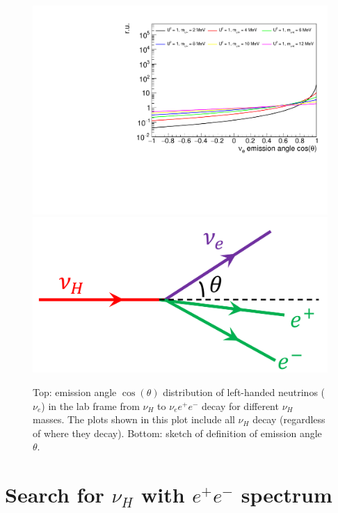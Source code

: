 \documentclass[%
 reprint,
 amsmath,amssymb,
 aps,
 prd,
floatfix,
twocolumn,
]{revtex4-1}
\begin{document}
\begin{figure}[!htbp]
\includegraphics[width=0.99\columnwidth]{../plots/nuLEmissionAngle_U1.0_AllMass_linXlogY.pdf}\\
\includegraphics[width=0.7\columnwidth]{figs/emission_angle_sketch.png}
\caption{Top: emission angle $\cos(\theta)$ distribution of left-handed neutrinos ($\nu_e$) in the lab frame from $\nu_H$ to $\nu_e e^+ e^-$ decay for different $\nu_H$ masses. The plots shown in this plot include all $\nu_H$ decay (regardless of where they decay). Bottom: sketch of definition of emission angle $\theta$.}
\label{fig:nuLEmissionAngle_all_decay} 
\end{figure}

\clearpage
\section{\label{sec:EeSpectrum} Search for $\nu_H$ with $e^+e^-$ spectrum}
\end{document}
